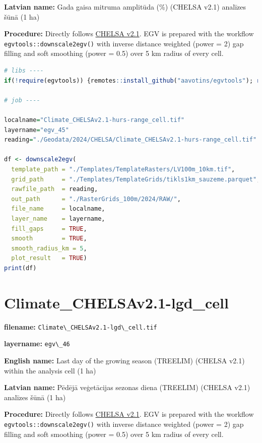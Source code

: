 \documentclass[
]{book}
\newcommand{\passthrough}[1]{#1}
\begin{document}
\textbf{Latvian name:} Gada gaisa mitruma amplitūda (\%) (CHELSA v2.1) analīzes šūnā (1 ha)

\textbf{Procedure:} Directly follows \hyperref[Ch04.11]{CHELSA v2.1}. EGV is prepared with the
workflow \passthrough{\lstinline!egvtools::downscale2egv()!} with inverse distance weighted (power = 2)
gap filling and soft smoothing (power = 0.5) over 5 km radius of every cell.

\begin{lstlisting}[language=R]
# libs ----
if(!require(egvtools)) {remotes::install_github("aavotins/egvtools"); require(egvtools)}

# job ----

localname="Climate_CHELSAv2.1-hurs-range_cell.tif"
layername="egv_45"
reading="./Geodata/2024/CHELSA/Climate_CHELSAv2.1-hurs-range_cell.tif"

df <- downscale2egv(
  template_path = "./Templates/TemplateRasters/LV100m_10km.tif",
  grid_path     = "./Templates/TemplateGrids/tikls1km_sauzeme.parquet",
  rawfile_path  = reading,
  out_path      = "./RasterGrids_100m/2024/RAW/",
  file_name     = localname,
  layer_name    = layername,
  fill_gaps     = TRUE,
  smooth        = TRUE,
  smooth_radius_km = 5,
  plot_result   = TRUE)
print(df)
\end{lstlisting}

\section{Climate\_CHELSAv2.1-lgd\_cell}\label{ch06.046}

\textbf{filename:} \passthrough{\lstinline!Climate\_CHELSAv2.1-lgd\_cell.tif!}

\textbf{layername:} \passthrough{\lstinline!egv\_46!}

\textbf{English name:} Last day of the growing season (TREELIM) (CHELSA v2.1) within the analysis cell (1 ha)

\textbf{Latvian name:} Pēdējā veģetācijas sezonas diena (TREELIM) (CHELSA v2.1) analīzes šūnā (1 ha)

\textbf{Procedure:} Directly follows \hyperref[Ch04.11]{CHELSA v2.1}. EGV is prepared with the
workflow \passthrough{\lstinline!egvtools::downscale2egv()!} with inverse distance weighted (power = 2)
gap filling and soft smoothing (power = 0.5) over 5 km radius of every cell.
\end{document}
